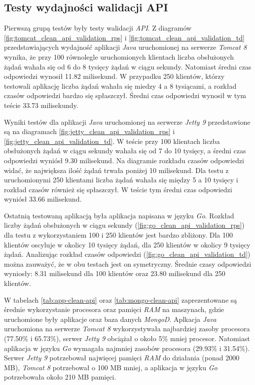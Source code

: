 \subsection{Testy wydajności walidacji API}
Pierwszą grupą testów były testy walidacji \textsl{API}. Z diagramów \ref{fig:tomcat_clean_api_validation_rps} i \ref{fig:tomcat_clean_api_validation_td} przedstawiających wydajność aplikacji \textsl{Java} uruchomionej na serwerze \textsl{Tomcat 8} wynika, że przy 100 równolegle uruchomionych klientach liczba obsłużonych żądań wahała się od 6 do 8 tysięcy żądań w ciągu sekundy. Natomiast średni czas odpowiedzi wynosił 11.82 milisekund. W przypadku 250 klientów, którzy testowali aplikację liczba żądań wahała się miedzy 4 a 8 tysiącami, a rozkład czasów odpowiedzi bardzo się spłaszczył. Średni czas odpowiedzi wynosił w tym teście 33.73 milisekundy.

Wyniki testów dla aplikacji \textsl{Java} uruchomionej na serwerze \textsl{Jetty 9} przedstawione są na diagramach \ref{fig:jetty_clean_api_validation_rps} i \ref{fig:jetty_clean_api_validation_td}. W teście przy 100 klientach liczba obsłużonych żądań w ciągu sekundy wahała się od 7 do 10 tysięcy, a średni czas odpowiedzi wyniósł 9.30 milisekund. Na diagramie rozkładu czasów odpowiedzi widać, że największa ilość żądań trwała poniżej 10 milisekund. Dla testu z uruchomionymi 250 klientami liczba żądań wahała się między 5 a 10 tysięcy i rozkład czasów również się spłaszczył. W teście tym średni czas odpowiedzi wyniósł 33.66 milisekund. 

Ostatnią testowaną aplikacją była aplikacja napisana w języku \textsl{Go}. Rozkład liczby żądań obsłużonych w ciągu sekundy (\ref{fig:go_clean_api_validation_rps}) dla testu z wykorzystaniem 100 i 250 klientów jest bardzo zbliżony. Dla 100 klientów oscyluje w okolicy 10 tysięcy żądań, dla 250 klientów w okolicy 9 tysięcy żądań. Analizując rozkład czasów odpowiedzi (\ref{fig:go_clean_api_validation_td}) można zauważyć, że w obu testach jest on symetryczny. Średnie czasy odpowiedzi wyniosły: 8.31 milisekund dla 100 klientów oraz 23.80 milisekund dla 250 klientów.

W tabelach \ref{tab:app-clean-api} oraz \ref{tab:mongo-clean-api} zaprezentowane są średnie wykorzystanie procesora oraz pamięci \textsl{RAM} na maszynach, gdzie uruchomione były aplikacje oraz baza danych \textsl{MongoD}. Aplkacja \textsl{Java} uruchomiona na serwerze \textsl{Tomcat 8} wykorzystywała najbardziej zasoby procesora (77.50\% i 65.73\%), serwer \textsl{Jetty 9} obciążał o około 5\% mniej procesor. Natomiast aplikacja w języku \textsl{Go} wymagała najmniej zasobów procesora (29.93\% i 31.54\%). Serwer \textsl{Jetty 9} potrzebował najwięcej pamięci \textsl{RAM} do działania (ponad 2000 MB), \textsl{Tomcat 8} potrzebował o 100 MB mniej, a aplikacja w języku \textsl{Go} potrzebowała około 210 MB pamięci. 

